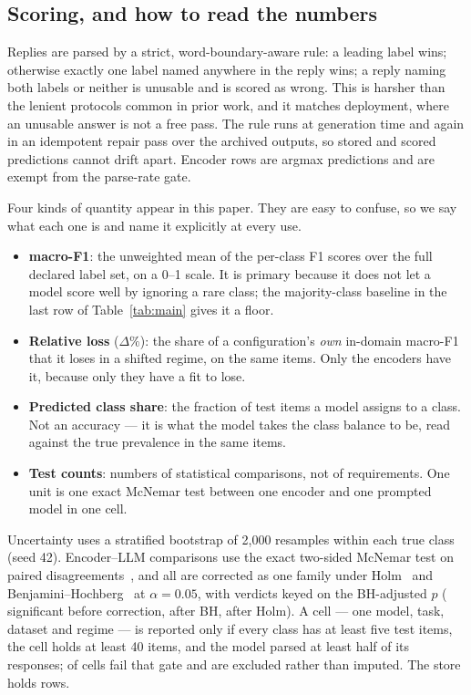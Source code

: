 \documentclass[conference]{IEEEtran}
\newcommand{\Fm}{macro-F1}
\begin{document}
\subsection{Scoring, and how to read the numbers}
\label{sec:scoring}
Replies are parsed by a strict, word-boundary-aware rule: a leading label wins;
otherwise exactly one label named anywhere in the reply wins; a reply naming both
labels or neither is unusable and is scored as wrong. This is harsher than the
lenient protocols common in prior work, and it matches deployment, where an
unusable answer is not a free pass. The rule runs at generation time and again in
an idempotent repair pass over the archived outputs, so stored and scored
predictions cannot drift apart. Encoder rows are argmax predictions and are
exempt from the parse-rate gate.

Four kinds of quantity appear in this paper. They are easy to confuse, so we say
what each one is and name it explicitly at every use.

\begin{itemize}\itemsep0.5pt \parskip0pt 
\item \textbf{\Fm{}}: the unweighted mean of the per-class F1 scores over the
      full declared label set, on a 0--1 scale. It is primary because it does not
      let a model score well by ignoring a rare class; the majority-class
      baseline in the last row of Table~\ref{tab:main} gives it a floor.
\item \textbf{Relative loss} ($\Delta\%$): the share of a configuration's
      \emph{own} in-domain \Fm{} that it loses in a shifted regime, on the same
      items. Only the encoders have it, because only they have a fit to lose.
\item \textbf{Predicted class share}: the fraction of test items a model assigns
      to a class. Not an accuracy --- it is what the model takes the class
      balance to be, read against the true prevalence in the same items.
\item \textbf{Test counts}: numbers of statistical comparisons, not of
      requirements. One unit is one exact McNemar test between one encoder and
      one prompted model in one cell.
\end{itemize}

Uncertainty uses a stratified bootstrap of 2,000 resamples within each true class
(seed 42). Encoder--LLM comparisons use the exact two-sided McNemar test on
paired disagreements~\cite{mcnemar1947}, and all \nNtests{} are corrected as one
family under Holm~\cite{holm1979} and Benjamini--Hochberg~\cite{bh1995} at
$\alpha = 0.05$, with verdicts keyed on the BH-adjusted $p$ (\nSigRaw{}
significant before correction, \nSigBH{} after BH, \nSigHolm{} after Holm). A
cell --- one model, task, dataset and regime --- is reported only if every class
has at least five test items, the cell holds at least 40 items, and the model
parsed at least half of its responses; \nNcellsdrop{} of \nNcells{} cells fail
that gate and are excluded rather than imputed. The store holds \nNpred{} rows.
\end{document}
